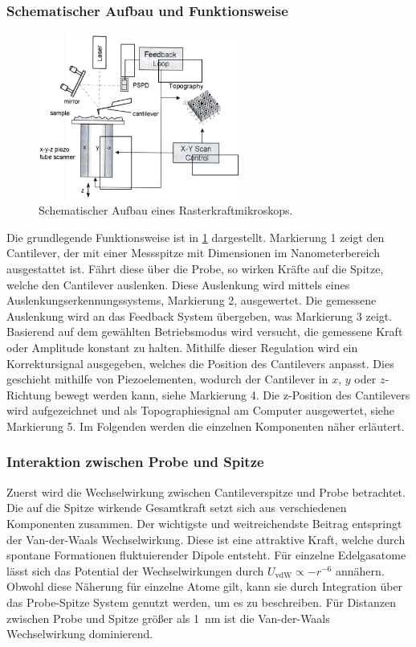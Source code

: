\subsubsection{Schematischer Aufbau und Funktionsweise}
\begin{figure}
    \centering
    \includegraphics[width=0.6\textwidth]{../assets/messmethoden/afm/01_aufbau}
    \caption{Schematischer Aufbau eines Rasterkraftmikroskops. }
    \label{fig:afm_aufbau}
\end{figure}
Die grundlegende Funktionsweise ist in \cref{fig:afm_aufbau} dargestellt.
Markierung 1 zeigt den Cantilever, der mit einer Messspitze mit Dimensionen im Nanometerbereich ausgestattet ist.
Fährt diese über die Probe, so wirken Kräfte auf die Spitze, welche den Cantilever auslenken.
Diese Auslenkung wird mittels eines Auslenkungserkennungssystems, Markierung 2, ausgewertet.
Die gemessene Auslenkung wird an das Feedback System übergeben, was Markierung 3 zeigt.
Basierend auf dem gewählten Betriebsmodus wird versucht, die gemessene Kraft oder Amplitude konstant zu halten.
Mithilfe dieser Regulation wird ein Korrektursignal ausgegeben, welches die Position des Cantilevers anpasst.
Dies geschieht mithilfe von Piezoelementen, wodurch der Cantilever in $x$, $y$ oder $z$-Richtung bewegt werden kann,
siehe Markierung 4.
Die z-Position des Cantilevers wird aufgezeichnet und als Topographiesignal am Computer ausgewertet, siehe Markierung 5.
Im Folgenden werden die einzelnen Komponenten näher erläutert.\autocite[8-10]{afm-buch}

\subsubsection{Interaktion zwischen Probe und Spitze}
Zuerst wird die Wechselwirkung zwischen Cantileverspitze und Probe betrachtet.
Die auf die Spitze wirkende Gesamtkraft setzt sich aus verschiedenen Komponenten zusammen.
Der wichtigste und weitreichendste Beitrag entspringt der Van-der-Waals Wechselwirkung.
Diese ist eine attraktive Kraft, welche durch spontane Formationen fluktuierender Dipole entsteht.
Für einzelne Edelgasatome lässt sich das Potential der Wechselwirkungen durch
$U_{\mathrm{vdW}}\propto-r^{-6}$ annähern.
Obwohl diese Näherung für einzelne Atome gilt, kann sie durch Integration über das Probe-Spitze System genutzt
werden, um es zu beschreiben.
Für Distanzen zwischen Probe und Spitze größer als \qty{1}{\nano\meter} ist die Van-der-Waals Wechselwirkung
dominierend.

